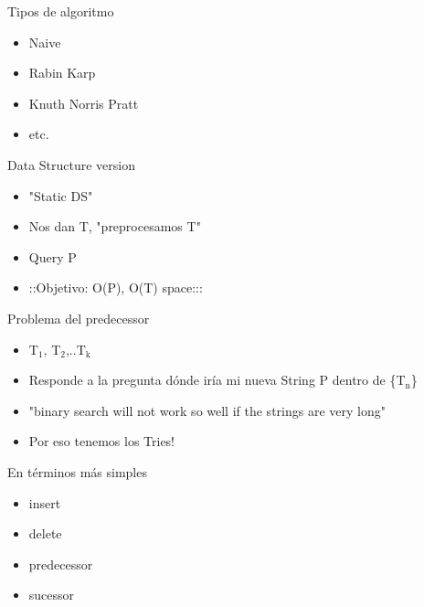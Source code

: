\documentclass[presentation]{beamer}
\begin{document}
\begin{frame}[label=sec-5]{Tipos de algoritmo}
\begin{itemize}
\item Naive
\item Rabin Karp
\item Knuth Norris Pratt
\item etc.
\end{itemize}
\end{frame}

\begin{frame}[label=sec-6]{Data Structure version}
\begin{itemize}
\item "Static DS"
\item Nos dan T, "preprocesamos T"
\item Query P
\item ::Objetivo: O(P), O(T) space:::
\end{itemize}
\end{frame}

\begin{frame}[label=sec-7]{Problema del predecessor}
\begin{itemize}
\item T$_{\text{1}}$, T$_{\text{2}}$,..T$_{\text{k}}$
\item Responde a la pregunta dónde iría mi nueva String P dentro de \{T$_{\text{n}}$\}
\item "binary search will not work so well if the strings are very long"
\item Por eso tenemos los Tries!
\end{itemize}

\begin{block}{En términos más simples}
\begin{itemize}
\item insert
\item delete
\item predecessor
\item sucessor
\end{itemize}
\end{block}
\end{frame}
\end{document}

